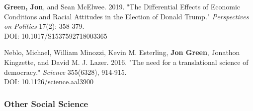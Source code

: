 \documentclass[letterpaper]{article}
\begin{document}
\begin{etaremune}
\item \textbf{Green, Jon}, and Sean McElwee. 2019. "The Differential Effects of Economic Conditions and Racial Attitudes in the Election of Donald Trump." \textit{Perspectives on Politics} 17(2): 358-379. \\
DOI: 10.1017/S1537592718003365

\item Neblo, Michael, William Minozzi, Kevin M. Esterling, \textbf{Jon Green}, Jonathon Kingzette, and David M. J. Lazer. 2016. "The need for a translational science of democracy." \textit{Science} 355(6328), 914-915.\\
DOI: 10.1126/science.aal3900

\end{etaremune}

\subsubsection*{Other Social Science}
\end{document}

